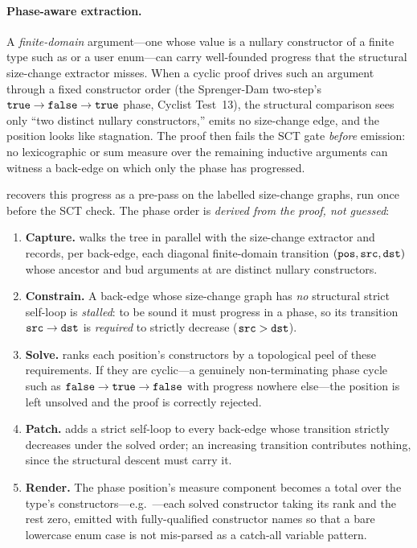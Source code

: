 \paragraph{Phase-aware extraction.}
A \emph{finite-domain} argument---one whose value is a nullary constructor of
a finite type such as  or a user enum---can carry well-founded
progress that the structural size-change extractor misses. When a cyclic proof
drives such an argument through a fixed constructor order (the Sprenger-Dam
two-step's \(\texttt{true} \to \texttt{false} \to \texttt{true}\) phase, Cyclist
Test~13), the structural comparison sees only ``two distinct nullary
constructors,'' emits no size-change edge, and the position looks like
stagnation. The proof then fails the SCT gate \emph{before} emission: no
lexicographic or sum measure over the remaining inductive arguments can
witness a back-edge on which only the phase has progressed.

 recovers this progress as a pre-pass on the
labelled size-change graphs, run once before the SCT check. The phase order is
\emph{derived from the proof, not guessed}:

\begin{enumerate}
  \item \textbf{Capture.}  walks the tree in parallel
    with the size-change extractor and records, per back-edge, each diagonal
    finite-domain transition \((\texttt{pos}, \texttt{src}, \texttt{dst})\) whose
    ancestor and bud arguments at  are distinct nullary
    constructors.
  \item \textbf{Constrain.} A back-edge whose size-change graph has \emph{no}
    structural strict self-loop is \emph{stalled}: to be sound it must progress
    in a phase, so its transition \(\texttt{src} \to \texttt{dst}\) is
    \emph{required} to strictly decrease (\(\texttt{src} > \texttt{dst}\)).
  \item \textbf{Solve.}  ranks each position's
    constructors by a topological peel of these requirements. If they are
    cyclic---a genuinely non-terminating phase cycle such as
    \(\texttt{false} \to \texttt{true} \to \texttt{false}\) with progress nowhere
    else---the position is left unsolved and the proof is correctly rejected.
  \item \textbf{Patch.}  adds a strict self-loop to every
    back-edge whose transition strictly decreases under the solved order; an
    increasing transition contributes nothing, since the structural descent
    must carry it.
  \item \textbf{Render.} The phase position's measure component becomes a total
     over the type's constructors---e.g.\
    ---each solved constructor
    taking its rank and the rest zero, emitted with fully-qualified
    constructor names so that a bare lowercase enum case is not mis-parsed as a
    catch-all variable pattern.
\end{enumerate}

